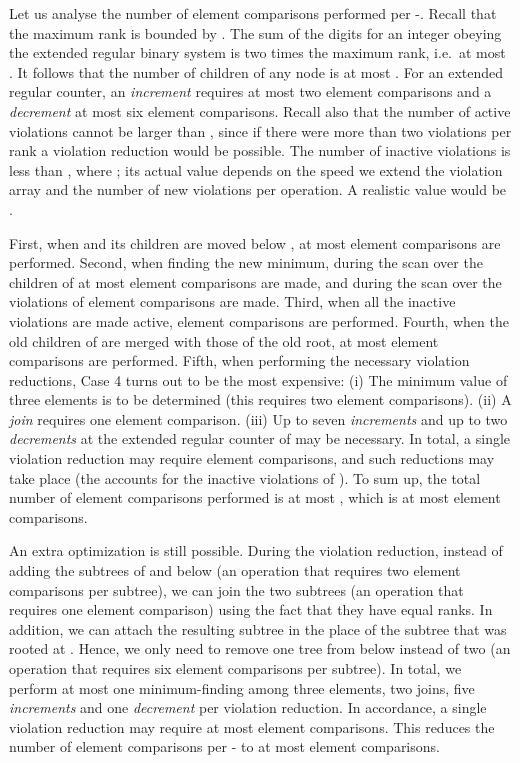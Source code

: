 \documentclass{llncs}
\newcommand{\Deletemin}{\mbox{\mbox{\rm -}}}
\begin{document}
Let us analyse the number of element comparisons performed per
\Deletemin{}.  Recall that the maximum rank is bounded by .  The sum of the digits for an integer obeying the extended regular
binary system is two times the maximum rank, i.e.~at most .  It follows that the number of children of any node is at most
.  For an extended regular counter, an {\it increment} requires at
most two element comparisons and a {\it decrement} at most six element
comparisons. Recall also that the number of active violations cannot
be larger than , since if there were more than two
violations per rank a violation reduction would be possible. The
number of inactive violations is less than , where
; its actual value depends on the speed we extend the
violation array and the number of new violations per operation. A
realistic value would be .

First, when  and its children are moved below , at most
 element comparisons are performed.  Second, when
finding the new minimum, during the scan over the children of  at
most  element comparisons are made, and during the scan
over the violations of   element
comparisons are made. Third, when all the inactive violations are made
active,  element comparisons are performed.
Fourth, when the old children of  are merged with those of the old
root, at most  element comparisons are performed.  Fifth,
when performing the necessary violation reductions, Case 4 turns out
to be the most expensive: (i) The minimum value of three elements is
to be determined (this requires two element comparisons). (ii) A {\it join}
requires one element comparison. (iii) Up to seven {\it increments} and up
to two {\it decrements} at the extended regular counter of  may be necessary. In total, a
single violation reduction may require  element comparisons, and
 such reductions may take place (the
 accounts for the inactive violations of ).  To sum
up, the total number of element comparisons performed is at most ,
which is at most  element comparisons.

An extra optimization is still possible. During the violation reduction, instead 
of adding the subtrees of  and  below  (an operation that requires two
element comparisons per subtree), we can join the two subtrees (an operation that 
requires one element comparison) using the fact that they have equal ranks. 
In addition, we can attach the resulting subtree in the place of the subtree that was rooted at . 
Hence, we only need to remove one tree from below  instead of two 
(an operation that requires six element comparisons per subtree).
In total, we perform at most one minimum-finding among three elements, 
two joins, five {\it increments} and one {\it decrement} per violation reduction. 
In accordance, a single violation reduction may require at most  element comparisons. 
This reduces the number of element comparisons per \Deletemin{} to at most
 element comparisons. 
\end{document}
